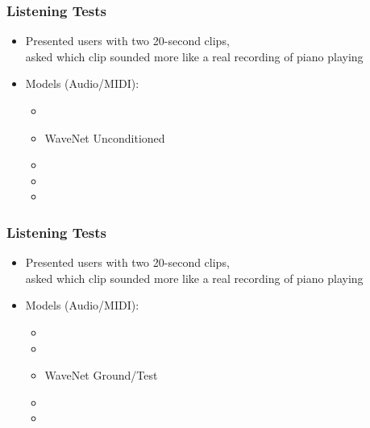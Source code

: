 \documentclass[dvipdfmx]{beamer}
\begin{document}
\begin{frame}[noframenumbering]
    \frametitle{Listening Tests}
    \begin{itemize}
        \item Presented users with two 20-second clips, \\
            asked which clip sounded more like a real recording of piano playing
    \end{itemize}
    \begin{itemize}
        \item Models {\scriptsize (Audio/MIDI)}:
        \begin{itemize}
            \item {}
            \item \alert{WaveNet Unconditioned}
            \item {}
            \item {}
            \item {}
        \end{itemize}
    \end{itemize}
\end{frame}


\begin{frame}[noframenumbering]
    \frametitle{Listening Tests}
    \begin{itemize}
        \item Presented users with two 20-second clips, \\
            asked which clip sounded more like a real recording of piano playing
    \end{itemize}
    \begin{itemize}
        \item Models {\scriptsize (Audio/MIDI)}:
        \begin{itemize}
            \item {}
            \item {}
            \item \alert{WaveNet Ground/Test}
            \item {}
            \item {}
        \end{itemize}
    \end{itemize}
\end{frame}
\end{document}
